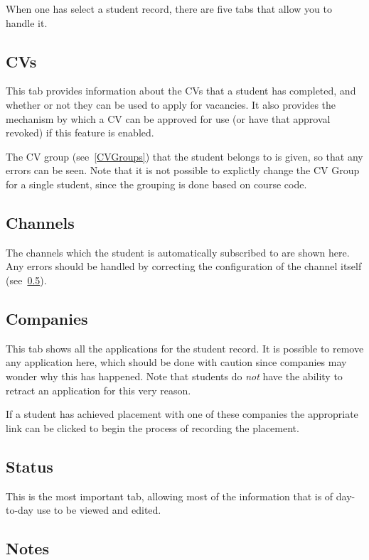 \documentclass[12 pt]{book}
\begin{document}
When one has select a student record, there are five tabs that allow you to handle it.

\subsection{CVs}

This tab provides information about the CVs that a student has completed, and whether or not they can
be used to apply for vacancies. It also provides the mechanism by which a CV can be approved for use
(or have that approval revoked) if this feature is enabled.

The CV group (see~\ref{CVGroups}) that the student belongs to is given, so that any errors can be seen. Note that
it is not possible to explictly change the CV Group for a single student, since the grouping is done based on course code.

\subsection{Channels}

The channels which the student is automatically subscribed to are shown here. Any errors should be handled by correcting the
configuration of the channel itself (see~\ref{}).

\subsection{Companies}

This tab shows all the applications for the student record. It is possible to remove any application here, which should be done with caution
since companies may wonder why this has happened. Note that students do \emph{not} have the ability  to retract an application for this very reason.

If a student has achieved placement with one of these companies the appropriate link can be clicked to begin the process of recording the placement.

\subsection{Status}

This is the most important tab, allowing most of the information that is of day-to-day use to be viewed and edited.

\subsection{Notes}
\end{document}
